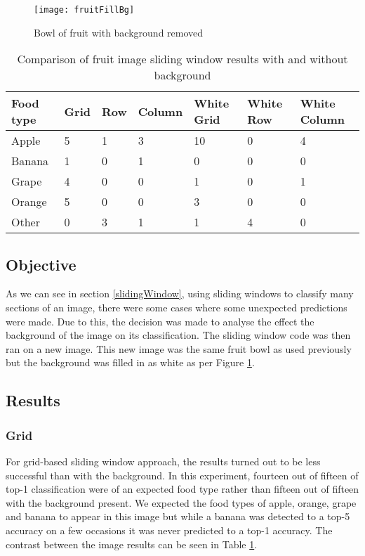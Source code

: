 \begin{figure}
    \texttt{[image: fruitFillBg]}
    \caption{Bowl of fruit with background removed}
    \label{fig:filledFruit}
\end{figure}

\begin{table}[h]
    \centering
    \caption{Comparison of fruit image sliding window results with and without
    background}
    \label{comparisionFruitTable}
    \begin{tabular}{|l|l|l|l|l|l|l|}
    \hline
        \textbf{Food type} & \textbf{Grid} & \textbf{Row} & \textbf{Column} & \textbf{White Grid} & \textbf{White Row} & \textbf{White Column} \\ \hline
        Apple     & 5    & 1   & 3      & 10          & 0          & 4
        \\ \hline
        Banana    & 1    & 0   & 1      & 0           & 0          & 0
        \\ \hline
        Grape     & 4    & 0   & 0      & 1           & 0          & 1
        \\ \hline
        Orange    & 5    & 0   & 0      & 3           & 0          & 0
        \\ \hline
        Other     & 0    & 3   & 1      & 1           & 4          & 0  \\ \hline           
    \end{tabular}
\end{table}

\subsection*{Objective}
As we can see in section \ref{slidingWindow}, using sliding windows to classify many sections
of an image, there were some cases where some unexpected predictions were made.
Due to this, the decision was made to analyse the effect the background of the
image on its classification. The sliding window code was then ran on a new
image. This new image was the same fruit bowl as used previously but the
background was filled in as white as per Figure \ref{fig:filledFruit}.

\subsection*{Results}
\subsubsection*{Grid}
For grid-based sliding window approach, the results turned out to be less
successful than with the background. In this experiment, fourteen out of fifteen
of top-1 classification were of an expected food type rather than fifteen out of
fifteen with the background present. We expected the food types of apple,
orange, grape and banana to appear in this image but while a banana was detected
to a top-5 accuracy on a few occasions it was never predicted to a top-1
accuracy. The contrast between the image results can be seen in Table
\ref{comparisionFruitTable}.

